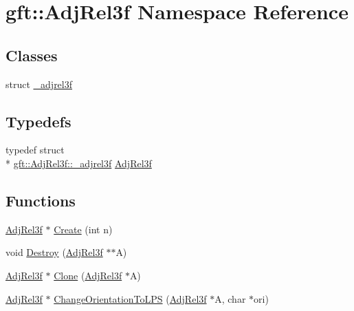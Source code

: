 \hypertarget{namespacegft_1_1AdjRel3f}{\section{gft\-:\-:Adj\-Rel3f Namespace Reference}
\label{namespacegft_1_1AdjRel3f}
}
\subsection*{Classes}
\begin{DoxyCompactItemize}
\item 
struct \hyperlink{structgft_1_1AdjRel3f_1_1__adjrel3f}{\-\_\-adjrel3f}
\end{DoxyCompactItemize}
\subsection*{Typedefs}
\begin{DoxyCompactItemize}
\item 
typedef struct \\*
\hyperlink{structgft_1_1AdjRel3f_1_1__adjrel3f}{gft\-::\-Adj\-Rel3f\-::\-\_\-adjrel3f} \hyperlink{namespacegft_1_1AdjRel3f_a83ef20d6a560143af34ad546deafbe5f}{Adj\-Rel3f}
\end{DoxyCompactItemize}
\subsection*{Functions}
\begin{DoxyCompactItemize}
\item 
\hyperlink{namespacegft_1_1AdjRel3f_a83ef20d6a560143af34ad546deafbe5f}{Adj\-Rel3f} $\ast$ \hyperlink{namespacegft_1_1AdjRel3f_a8c388ab107054630739ecdb957c46212}{Create} (int n)
\item 
void \hyperlink{namespacegft_1_1AdjRel3f_a26d834bf9f5e28f703f4d522fef9e5a7}{Destroy} (\hyperlink{namespacegft_1_1AdjRel3f_a83ef20d6a560143af34ad546deafbe5f}{Adj\-Rel3f} $\ast$$\ast$A)
\item 
\hyperlink{namespacegft_1_1AdjRel3f_a83ef20d6a560143af34ad546deafbe5f}{Adj\-Rel3f} $\ast$ \hyperlink{namespacegft_1_1AdjRel3f_a50777d7cc57f992b20684e6aa88213dc}{Clone} (\hyperlink{namespacegft_1_1AdjRel3f_a83ef20d6a560143af34ad546deafbe5f}{Adj\-Rel3f} $\ast$A)
\item 
\hyperlink{namespacegft_1_1AdjRel3f_a83ef20d6a560143af34ad546deafbe5f}{Adj\-Rel3f} $\ast$ \hyperlink{namespacegft_1_1AdjRel3f_a99f59adde08f74da69c0eb892220db35}{Change\-Orientation\-To\-L\-P\-S} (\hyperlink{namespacegft_1_1AdjRel3f_a83ef20d6a560143af34ad546deafbe5f}{Adj\-Rel3f} $\ast$A, char $\ast$ori)
\end{DoxyCompactItemize}


